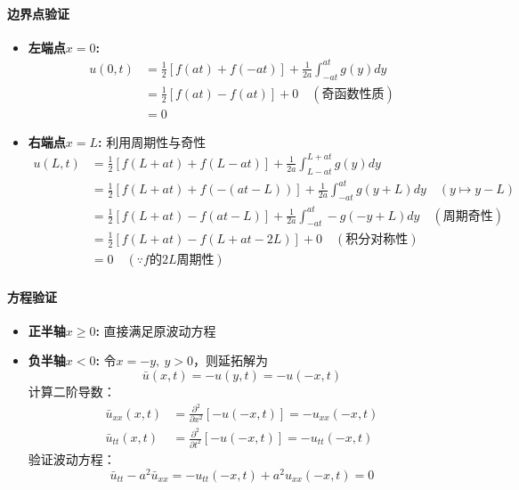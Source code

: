 \documentclass[12pt,a4paper]{article}
\numberwithin{subsection}{section}   %
\numberwithin{subsubsection}{subsection}
\theoremstyle{plain}
\theoremstyle{definition}
\theoremstyle{remark}
\theoremstyle{remark}
\begin{document}
\paragraph{边界点验证}
\begin{itemize}
	\item \textbf{左端点$x=0$:}
	\begin{align*}
		u(0,t) &= \frac{1}{2}[f(at) + f(-at)] + \frac{1}{2a}\int_{-at}^{at} g(y) dy \\
		&= \frac{1}{2}[f(at) - f(at)] + 0 \quad (\text{奇函数性质}) \\
		&= 0
	\end{align*}
	
	\item \textbf{右端点$x=L$:} 利用周期性与奇性
	\begin{align*}
		u(L,t) &= \frac{1}{2}[f(L+at) + f(L-at)] + \frac{1}{2a}\int_{L-at}^{L+at} g(y) dy \\
		&= \frac{1}{2}[f(L+at) + f(-(at-L))] + \frac{1}{2a}\int_{-at}^{at} g(y+L) dy \quad (y \mapsto y-L) \\
		&= \frac{1}{2}[f(L+at) - f(at-L)] + \frac{1}{2a}\int_{-at}^{at} -g(-y+L) dy \quad (\text{周期奇性}) \\
		&= \frac{1}{2}[f(L+at) - f(L+at-2L)] + 0 \quad (\text{积分对称性}) \\
		&= 0 \quad (\because f\text{的}2L\text{周期性})
	\end{align*}
\end{itemize}

\paragraph{方程验证}
\begin{itemize}
	\item \textbf{正半轴$x \geq 0$:} 直接满足原波动方程
	
	\item \textbf{负半轴$x < 0$:} 令$x = -y,\ y > 0$，则延拓解为
	\[
	\bar{u}(x,t) = -u(y,t) = -u(-x,t)
	\]
	计算二阶导数：
	\begin{align}
		\bar{u}_{xx}(x,t) &= \frac{\partial^2}{\partial x^2}[-u(-x,t)] = -u_{xx}(-x,t) \\
		\bar{u}_{tt}(x,t) &= \frac{\partial^2}{\partial t^2}[-u(-x,t)] = -u_{tt}(-x,t)
	\end{align}
	验证波动方程：
	\[
	\bar{u}_{tt} - a^2\bar{u}_{xx} = -u_{tt}(-x,t) + a^2u_{xx}(-x,t) = 0 
	\]
\end{itemize}
\end{document}
